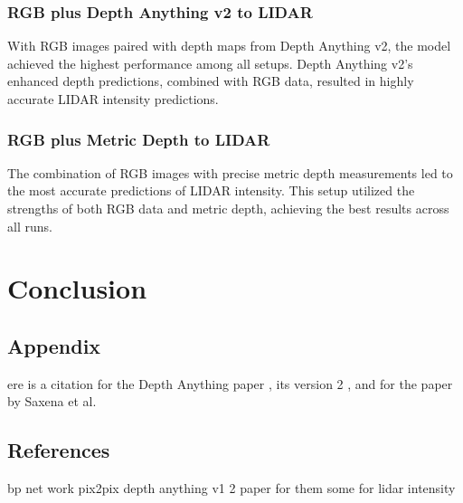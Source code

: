 \subsection{RGB plus Depth Anything v2 to LIDAR}

With RGB images paired with depth maps from Depth Anything v2, the model achieved the highest performance among all setups. Depth Anything v2’s enhanced depth predictions, combined with RGB data, resulted in highly accurate LIDAR intensity predictions.

\subsection{RGB plus Metric Depth to LIDAR}

The combination of RGB images with precise metric depth measurements led to the most accurate predictions of LIDAR intensity. This setup utilized the strengths of both RGB data and metric depth, achieving the best results across all runs.

\chapter{Conclusion}
\section{Appendix}
ere is a citation for the Depth Anything paper \cite{depthanything}, its version 2 \cite{depth_anything_v2}, and for the paper by Saxena et al. \cite{saxena2008depth}

\section{References}
bp net work
pix2pix
depth anything v1 2
paper for them 
some for lidar intensity
